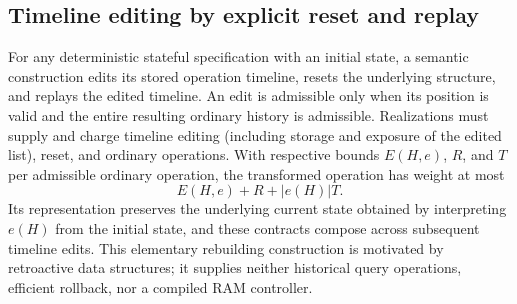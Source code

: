 \begin{result}
\subsection{Timeline editing by explicit reset and replay}
For any deterministic stateful specification with an initial state, a semantic construction edits
its stored operation timeline, resets the underlying structure, and replays the edited timeline.
An edit is admissible only when its position is valid and the entire resulting ordinary history is
admissible. Realizations must supply and charge timeline editing (including storage and exposure
of the edited list), reset, and ordinary operations. With respective bounds $E(H,e)$, $R$, and
$T$ per admissible ordinary operation, the transformed operation has weight at most
\[
 E(H,e)+R+|e(H)|T.
\]
Its representation preserves the underlying current state obtained by interpreting $e(H)$ from
the initial state, and these contracts compose across subsequent timeline edits. This elementary
rebuilding construction is motivated by retroactive data structures; it supplies neither historical
query operations, efficient rollback, nor a compiled RAM controller.\citep{DIL2007}
\end{result}
